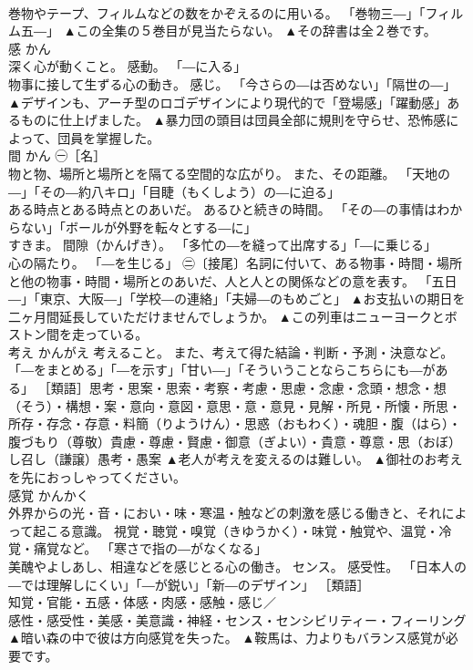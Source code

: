 \documentclass[8pt]{extreport}
\begin{document}
\begin{CJK}{UTF8}{min}
\\	巻物やテープ、フィルムなどの数をかぞえるのに用いる。 「巻物三―」「フィルム五―」	▲この全集の５巻目が見当たらない。 ▲その辞書は全２巻です。
\\	感	かん	
\\	深く心が動くこと。 感動。 「―に入る」 
\\	物事に接して生ずる心の動き。 感じ。 「今さらの―は否めない」「隔世の―」	▲デザインも、アーチ型のロゴデザインにより現代的で「登場感」「躍動感」あるものに仕上げました。 ▲暴力団の頭目は団員全部に規則を守らせ、恐怖感によって、団員を掌握した。
\\	間	かん	㊀［名］ 
\\	物と物、場所と場所とを隔てる空間的な広がり。 また、その距離。 「天地の―」「その―約八キロ」「目睫（もくしよう）の―に迫る」 
\\	ある時点とある時点とのあいだ。 あるひと続きの時間。 「その―の事情はわからない」「ボールが外野を転々とする―に」 
\\	すきま。 間隙（かんげき）。 「多忙の―を縫って出席する」「―に乗じる」 
\\	心の隔たり。 「―を生じる」 ㊁〔接尾〕名詞に付いて、ある物事・時間・場所と他の物事・時間・場所とのあいだ、人と人との関係などの意を表す。 「五日―」「東京、大阪―」「学校―の連絡」「夫婦―のもめごと」	▲お支払いの期日を二ヶ月間延長していただけませんでしょうか。 ▲この列車はニューヨークとボストン間を走っている。
\\	考え	かんがえ	考えること。 また、考えて得た結論・判断・予測・決意など。 「―をまとめる」「―を示す」「甘い―」「そういうことならこちらにも―がある」 ［類語］思考・思案・思索・考察・考慮・思慮・念慮・念頭・想念・想（そう）・構想・案・意向・意図・意思・意・意見・見解・所見・所懐・所思・所存・存念・存意・料簡（りようけん）・思惑（おもわく）・魂胆・腹（はら）・腹づもり（尊敬）貴慮・尊慮・賢慮・御意（ぎよい）・貴意・尊意・思（おぼ）し召し（謙譲）愚考・愚案	▲老人が考えを変えるのは難しい。 ▲御社のお考えを先におっしゃってください。
\\	感覚	かんかく	
\\	外界からの光・音・におい・味・寒温・触などの刺激を感じる働きと、それによって起こる意識。 視覚・聴覚・嗅覚（きゆうかく）・味覚・触覚や、温覚・冷覚・痛覚など。 「寒さで指の―がなくなる」 
\\	美醜やよしあし、相違などを感じとる心の働き。 センス。 感受性。 「日本人の―では理解しにくい」「―が鋭い」「新―のデザイン」 ［類語］
\\	知覚・官能・五感・体感・肉感・感触・感じ／
\\	感性・感受性・美感・美意識・神経・センス・センシビリティー・フィーリング	▲暗い森の中で彼は方向感覚を失った。 ▲鞍馬は、力よりもバランス感覚が必要です。

\end{CJK}
\end{document}
